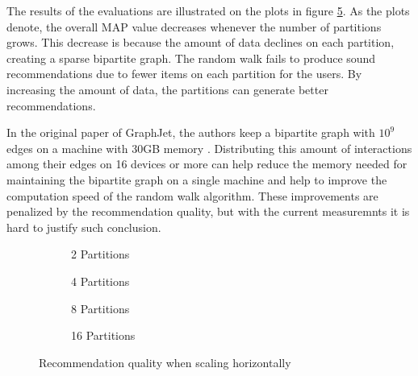 The results of the evaluations are illustrated on the plots in figure \ref{fig:horizontal-scaling}. As the plots denote, the overall MAP value decreases whenever the number of partitions grows. This decrease is because the amount of data declines on each partition, creating a sparse bipartite graph. The random walk fails to produce sound recommendations due to fewer items on each partition for the users. By increasing the amount of data, the partitions can generate better recommendations. 


In the original paper of GraphJet, the authors keep a bipartite graph with $10^9$ edges on a machine with 30GB memory \cite{sharmaGraphJetRealtimeContent2016}. Distributing this amount of interactions among their edges on 16 devices or more can help reduce the memory needed for maintaining the bipartite graph on a single machine and help to improve the computation speed of the random walk algorithm. These improvements are penalized by the recommendation quality, but with the current measuremnts it is hard to justify such conclusion.


\begin{figure}[!htb]
	\centering
	\begin{subfigure}[b]{0.5\linewidth}
	  \centering
	  
	  \caption{2 Partitions} 
	  \label{fig:horizontal-scaling-2-partitions-a} 
	  \vspace{1cm}
	\end{subfigure}%
	\begin{subfigure}[b]{0.5\linewidth}
	  \centering
	  
	  \caption{4 Partitions} 
	  \label{fig:horizontal-scaling-4-partitions-b} 
	  \vspace{1cm}
	\end{subfigure} 
	\begin{subfigure}[b]{0.5\linewidth}
	  \centering
	  
	  \caption{8 Partitions} 
	  \label{fig:horizontal-scaling-8-partitions-c} 
	\end{subfigure}%
	\begin{subfigure}[b]{0.5\linewidth}
	  \centering
	  
	  \caption{16 Partitions} 
	  \label{fig:horizontal-scaling-16-partitions-d} 
	\end{subfigure} 
	\caption{Recommendation quality when scaling horizontally}
	\label{fig:horizontal-scaling} 
\end{figure}
